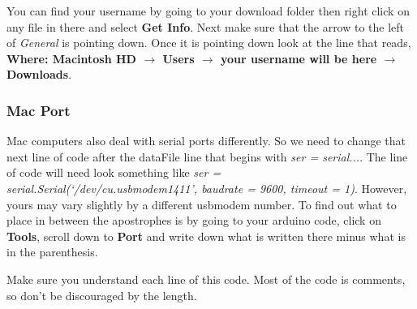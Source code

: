 You can find your username by going to your download folder then right click
on any file in there and select \textbf{Get Info}. Next make sure that the
arrow to the left of \textit{General} is pointing down. Once it is pointing
down look at the line that reads, \textbf{Where: Macintosh HD $\rightarrow $
Users $\rightarrow $ your username will be here $\rightarrow $ Downloads}.

\subsubsection{Mac Port}

Mac computers also deal with serial ports differently. So we need to change
that next line of code after the dataFile line that begins with \textit{ser
= serial...}. The line of code will need look something like \textit{ser =
serial.Serial(`/dev/cu.usbmodem1411', baudrate = 9600, timeout = 1)}.
However, yours may vary slightly by a different usbmodem number. To find out
what to place in between the apostrophes is by going to your arduino code,
click on \textbf{Tools}, scroll down to \textbf{Port} and write down what is
written there minus what is in the parenthesis.



Make sure you understand each line of this code. 
Most of the code is comments, so don't
be discouraged by the length.

